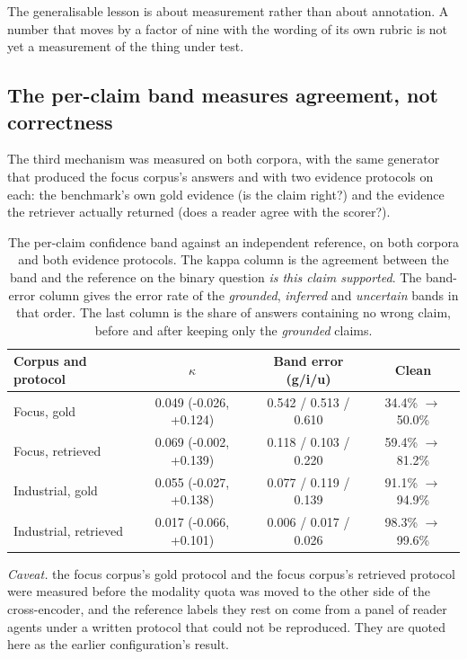 \documentclass[preprint,3p,times]{elsarticle}
\begin{document}
The generalisable lesson is about measurement rather than about annotation.
A number that moves by a factor of nine with the wording of its own rubric
is not yet a measurement of the thing under test.

\subsection{The per-claim band measures agreement, not correctness}

The third mechanism was measured on both corpora, with the same generator
that produced the focus corpus's answers and with two evidence protocols on
each: the benchmark's own gold evidence (is the claim right?) and the
evidence the retriever actually returned (does a reader agree with the
scorer?).

\begin{table}[t]
\centering
\caption{The per-claim confidence band against an independent reference, on both corpora and both evidence protocols. The kappa column is the agreement between the band and the reference on the binary question \emph{is this claim supported}. The band-error column gives the error rate of the \emph{grounded}, \emph{inferred} and \emph{uncertain} bands in that order. The last column is the share of answers containing no wrong claim, before and after keeping only the \emph{grounded} claims.}
\label{tab:ind-band}
\small
\begin{tabular}{lccc}
\toprule
Corpus and protocol & $\kappa$ & Band error (g/i/u) & Clean \\\midrule
Focus, gold & 0.049 (-0.026, +0.124) & 0.542 / 0.513 / 0.610 & 34.4\% $\rightarrow$ 50.0\% \\
Focus, retrieved & 0.069 (-0.002, +0.139) & 0.118 / 0.103 / 0.220 & 59.4\% $\rightarrow$ 81.2\% \\
Industrial, gold & 0.055 (-0.027, +0.138) & 0.077 / 0.119 / 0.139 & 91.1\% $\rightarrow$ 94.9\% \\
Industrial, retrieved & 0.017 (-0.066, +0.101) & 0.006 / 0.017 / 0.026 & 98.3\% $\rightarrow$ 99.6\% \\
\bottomrule
\end{tabular}
\end{table}


\emph{Caveat.} the focus corpus's gold protocol and the focus corpus's retrieved protocol were measured before the modality quota was moved to the other side of the cross-encoder, and the reference labels they rest on come from a panel of reader agents under a written protocol that could not be reproduced. They are quoted here as the earlier configuration's result.
\end{document}

